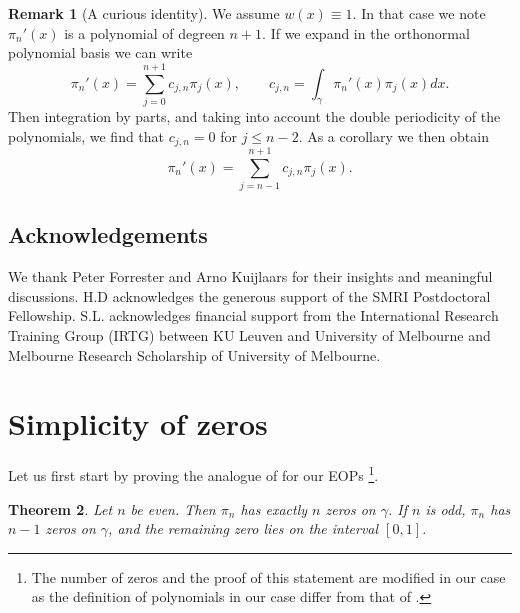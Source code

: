 \documentclass[11pt,a4paper]{article}
\newtheorem{theorem}{Theorem}
\theoremstyle{definition}
\newtheorem{remark}[theorem]{Remark}
\numberwithin{equation}{section}
\numberwithin{theorem}{section}
\newcommand{\myrmk}[2]{\begin{quote}\fbox{\begin{minipage}{\linewidth}\small \noindent{\color{red}\bf #2:} #1{\color{red}}\end{minipage}}\end{quote}}
\newcommand{\rmkH}[1]{\myrmk{#1}{HD}}
\newcommand{\rmkS}[1]{\myrmk{#1}{SL}}
\begin{document}
\begin{remark}[A curious identity]
We assume $w(x)\equiv 1$. In that case we note $\pi_{n}'(x)$ is a polynomial of degreen $n+1$. If we expand in the orthonormal polynomial basis we can write 
\begin{equation}
    \pi_n'(x)=\sum_{j=0}^{n+1}c_{j,n}\pi_{j}(x),\qquad c_{j,n}=\int_\gamma \pi_{n}'(x)\pi_{j}(x)dx.
\end{equation}
Then integration by parts, and taking into account the double periodicity of the polynomials, we find that $c_{j,n}=0$ for $j\leq n-2$. As a corollary we then obtain 
\begin{equation}
    \pi_n'(x)=\sum_{j=n-1}^{n+1}c_{j,n}\pi_{j}(x).
\end{equation}
\end{remark}
\subsection*{Acknowledgements}
We thank Peter Forrester and Arno Kuijlaars for their insights and meaningful discussions.
H.D acknowledges the generous support of the SMRI Postdoctoral Fellowship.
S.L. acknowledges financial support from the International Research Training Group (IRTG) between KU Leuven and University of Melbourne and Melbourne Research Scholarship of University of Melbourne.
\appendix
\section{Simplicity of zeros}\label{simplezero}
Let us first start by proving the analogue of \cite[Theorem 2.3, 2.4]{bertola2022nonlinear} for our EOPs \footnote{The number of zeros and the proof of this statement are modified in our case as the definition of polynomials in our case differ from that of \cite{bertola2022nonlinear}.}.
\begin{theorem}\label{zerothm}
    Let \( n \) be even. Then \( \pi_n \) has exactly \( n \) zeros on \( \gamma \). If \( n \) is odd, \( \pi_n \) has \( n-1 \)  zeros on \( \gamma \), and the remaining zero lies on the interval $[0,1]$.
\end{theorem}
\end{document}
